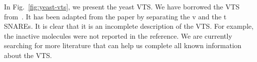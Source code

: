 

In Fig.~\ref{fig:yeast-vts}, we present the yeast VTS.
%
We have borrowed the VTS from~\cite{burri2004complete}.
%
It has been adapted from the paper by
separating the v and the t SNAREs. 
%
It is clear that it is an incomplete description of the VTS.
%
For example, the inactive molecules were not reported in the reference.
%
We are currently searching for more literature that can help us complete
all known information about the VTS.
%



